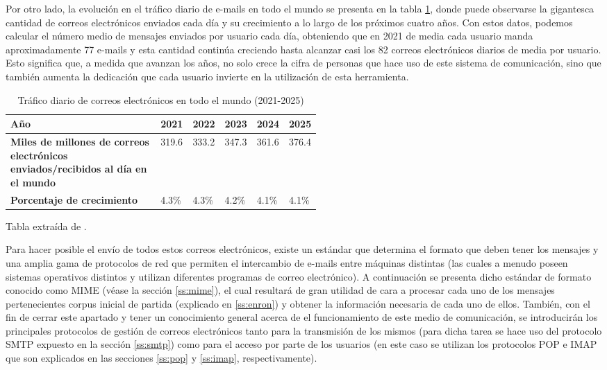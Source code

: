 Por otro lado, la evolución en el tráfico diario de e-mails en todo el mundo se presenta en la tabla \ref{tab:dailymail}, donde puede observarse la gigantesca cantidad de correos electrónicos enviados cada día y su crecimiento a lo largo de los próximos cuatro años. Con estos datos, podemos calcular el número medio de mensajes enviados por usuario cada día, obteniendo que en 2021 de media cada usuario manda aproximadamente 77 e-mails y esta cantidad continúa creciendo hasta alcanzar casi los 82 correos electrónicos diarios de media por usuario. Esto significa que, a medida que avanzan los años, no solo crece la cifra de personas que hace uso de este sistema de comunicación, sino que también aumenta la dedicación que cada usuario invierte en la utilización de esta herramienta.

\begin{table}[h]
	\centering
	\begin{tabular}{|p{0.52\linewidth}|l|l|l|l|l|}
		\hline
		\textbf{Año} & 2021 & 2022 & 2023 & 2024 & 2025 \\ \hline
		\textbf{Miles de millones de correos electrónicos enviados/recibidos al día en el mundo} & 319.6 & 333.2 & 347.3 & 361.6 & 376.4\\ \hline
		\textbf{Porcentaje de crecimiento} & 4.3\% & 4.3\% & 4.2\% & 4.1\% & 4.1\% \\ \hline
	\end{tabular}
	\caption{Tráfico diario de correos electrónicos en todo el mundo (2021-2025)}\label{tab:dailymail}
	Tabla extraída de \cite{radicati2020email}.
\end{table}

Para hacer posible el envío de todos estos correos electrónicos, existe un estándar que determina el formato que deben tener los mensajes y una amplia gama de protocolos de red que permiten el intercambio de e-mails entre máquinas distintas (las cuales a menudo poseen sistemas operativos distintos y utilizan diferentes programas de correo electrónico). A continuación se presenta dicho estándar de formato conocido como MIME (véase la sección \ref{ss:mime}), el cual resultará de gran utilidad de cara a procesar cada uno de los mensajes pertenecientes corpus inicial de partida (explicado en \ref{ss:enron}) y obtener la información necesaria de cada uno de ellos. También, con el fin de cerrar este apartado y tener un conocimiento general acerca de el funcionamiento de este medio de comunicación, se introducirán los principales protocolos de gestión de correos electrónicos tanto para la transmisión de los mismos (para dicha tarea se hace uso del protocolo SMTP expuesto en la sección \ref{ss:smtp}) como para el acceso por parte de los usuarios (en este caso se utilizan los protocolos POP e IMAP que son explicados en las secciones \ref{ss:pop} y \ref{ss:imap}, respectivamente).

